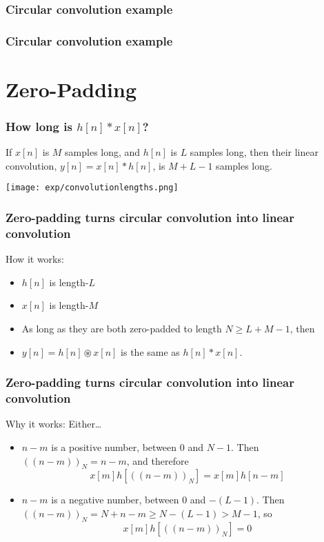 \documentclass{beamer}
\begin{document}
\begin{frame}
  \frametitle{Circular convolution example}

  \centerline{}
\end{frame}

\begin{frame}
  \frametitle{Circular convolution example}

  \centerline{}
\end{frame}


\section[Zero-Padding]{Zero-Padding}
\setcounter{subsection}{1}

\begin{frame}
  \frametitle{How long is $h[n]\ast x[n]$?}

  If $x[n]$ is $M$ samples long, and $h[n]$ is $L$ samples long, then
  their linear convolution, $y[n] = x[n]\ast h[n]$, is $M+L-1$ samples long.
  
  \centerline{\texttt{[image: exp/convolutionlengths.png]}}
\end{frame}

\begin{frame}
  \frametitle{Zero-padding turns circular convolution into linear convolution}

  How it works:
  \begin{itemize}
  \item $h[n]$ is length-$L$
  \item $x[n]$ is length-$M$
  \item As long as they are both zero-padded to length $N\ge L+M-1$, then
  \item $y[n] = h[n]\circledast x[n]$ is the same as $h[n]\ast x[n]$.
  \end{itemize}
\end{frame}
  
\begin{frame}
  \frametitle{Zero-padding turns circular convolution into linear convolution}

  Why it works:  Either\ldots
  \begin{itemize}
  \item $n-m$ is a positive number, between $0$ and $N-1$.  Then
    $(\!(n-m)\!)_N=n-m$, and therefore
    \begin{displaymath}
      x[m]h\left[(\!(n-m)\!)_N\right]=x[m]h[n-m]
    \end{displaymath}
  \item $n-m$ is a negative number, between $0$ and $-(L-1)$.  Then
    $(\!(n-m)\!)_N=N+n-m\ge N-(L-1)>M-1$, so
    \begin{displaymath}
      x[m]h\left[(\!(n-m)\!)_N\right]=0
    \end{displaymath}
  \end{itemize}
\end{frame}
  
\end{document}
